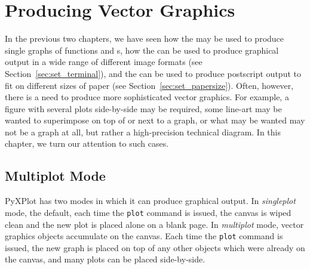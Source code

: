 %
%
%
%
%



\chapter{Producing Vector Graphics}
\label{ch:vector_graphics}

In the previous two chapters, we have seen how the  may be used to
produce single graphs of functions and \datafile s, how the  can be used to produce graphical output in a wide range of different
image formats (see Section~\ref{sec:set_terminal}), and the  can be used to produce postscript output to fit on different sizes
of paper (see Section~\ref{sec:set_papersize}). Often, however, there is a need
to produce more sophisticated vector graphics.  For example, a figure with
several plots side-by-side may be required, some line-art may be wanted to
superimpose on top of or next to a graph, or what may be wanted may not be a
graph at all, but rather a high-precision technical diagram. In this chapter,
we turn our attention to such cases.

\section{Multiplot Mode}
\label{sec:multiplot}

PyXPlot has two modes in which it can produce graphical output. In {\it
singleplot} mode, the default, each time the {\tt plot} command is issued, the
canvas is wiped clean and the new plot is placed alone on a blank page. In {\it
multiplot} mode, vector graphics objects accumulate on the canvas. Each time
the {\tt plot} command is issued, the new graph is placed on top of any other
objects which were already on the canvas, and many plots can be placed
side-by-side.


